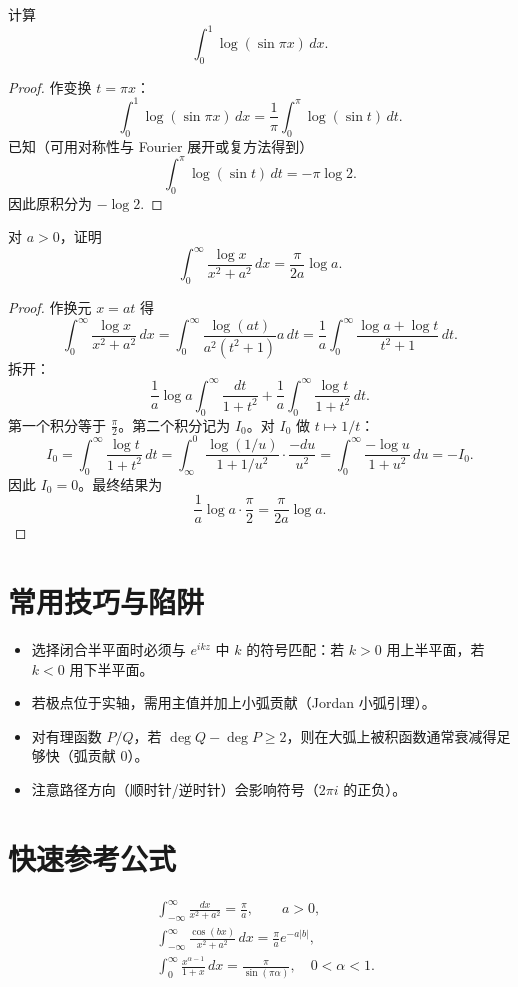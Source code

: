 \documentclass[lang=cn,10pt]{elegantbook}
\begin{document}
	\bigskip
	
	\begin{example}
		计算
		\[
		\int_0^1 \log(\sin\pi x)\,dx.
		\]
	\end{example}
	
	\begin{proof}
		作变换 \(t=\pi x\)：
		\[
		\int_0^1 \log(\sin\pi x)\,dx
		=\frac{1}{\pi}\int_0^\pi \log(\sin t)\,dt.
		\]
		已知（可用对称性与 Fourier 展开或复方法得到）
		\[
		\int_0^\pi \log(\sin t)\,dt = -\pi\log 2.
		\]
		因此原积分为 \(-\log 2\).
	\end{proof}
	
	\bigskip
	
	\begin{example}
		对 \(a>0\)，证明
		\[
		\int_0^\infty \frac{\log x}{x^2+a^2}\,dx = \frac{\pi}{2a}\log a.
		\]
	\end{example}
	
	\begin{proof}
		作换元 \(x=a t\) 得
		\[
		\int_0^\infty \frac{\log x}{x^2+a^2}\,dx
		= \int_0^\infty \frac{\log(a t)}{a^2(t^2+1)} a\,dt
		= \frac{1}{a}\int_0^\infty \frac{\log a + \log t}{t^2+1}\,dt.
		\]
		拆开：
		\[
		\frac{1}{a}\log a \int_0^\infty\frac{dt}{1+t^2}
		+\frac{1}{a}\int_0^\infty\frac{\log t}{1+t^2}\,dt.
		\]
		第一个积分等于 \(\frac{\pi}{2}\)。第二个积分记为 \(I_0\)。对 \(I_0\) 做 \(t\mapsto 1/t\)：
		\[
		I_0=\int_0^\infty\frac{\log t}{1+t^2}\,dt
		=\int_\infty^0\frac{\log(1/u)}{1+1/u^2}\cdot\frac{-du}{u^2}
		=\int_0^\infty\frac{-\log u}{1+u^2}\,du = -I_0.
		\]
		因此 \(I_0=0\)。最终结果为
		\[
		\frac{1}{a}\log a\cdot\frac{\pi}{2} = \frac{\pi}{2a}\log a.
		\]
	\end{proof}
	
	
	\section{常用技巧与陷阱}
	\begin{itemize}[leftmargin=*,itemsep=4pt]
		\item 选择闭合半平面时必须与 \(e^{ikz}\) 中 \(k\) 的符号匹配：若 \(k>0\) 用上半平面，若 \(k<0\) 用下半平面。
		\item 若极点位于实轴，需用主值并加上小弧贡献（Jordan 小弧引理）。
		\item 对有理函数 \(P/Q\)，若 \(\deg Q - \deg P\ge2\)，则在大弧上被积函数通常衰减得足够快（弧贡献 \(0\)）。
		\item 注意路径方向（顺时针/逆时针）会影响符号（\(2\pi i\) 的正负）。
	\end{itemize}
	
	\section{快速参考公式}
	\begin{align*}
		&\int_{-\infty}^\infty \frac{dx}{x^2+a^2}=\frac{\pi}{a},\qquad a>0,\\
		&\int_{-\infty}^\infty \frac{\cos(bx)}{x^2+a^2}\,dx=\frac{\pi}{a}e^{-a|b|},\\
		&\int_0^\infty \frac{x^{\alpha-1}}{1+x}\,dx=\frac{\pi}{\sin(\pi\alpha)},\quad 0<\alpha<1.
	\end{align*}
\end{document}
